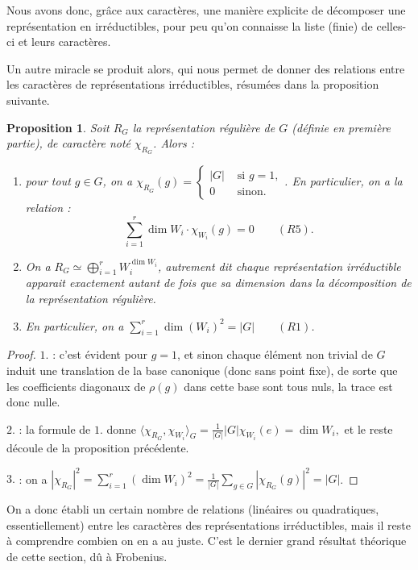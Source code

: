 \documentclass[a4paper]{article}
\theoremstyle{definition} %
\theoremstyle{plain} %
\newtheorem{Prop}[Def]{Proposition} %
\theoremstyle{remark} %
\begin{document}
Nous avons donc, grâce aux caractères, une manière explicite de décomposer une représentation en irréductibles, pour peu qu'on connaisse la liste (finie) de celles-ci et leurs caractères. 

Un autre miracle se produit alors, qui nous permet de donner des relations entre les caractères de représentations irréductibles, résumées dans la proposition suivante.

\begin{Prop}
	Soit $R_G$ la représentation régulière de $G$ (définie en première partie), de caractère noté $\chi_{R_G}$. Alors : 
	\begin{enumerate}
	\item pour tout $g \in G$, on a
	$\displaystyle \chi_{R_G}(g) = \left\{ \begin{array}{cl} |G| & {\text{ si }} g=1, \\
	0 & {\text{ sinon. }} \end{array} \right.$. En particulier, on a la relation :  \[
\sum_{i=1}^r \dim W_i \cdot \chi_{W_i} (g) = 0  \qquad (R5).\]
	
	\item On a 
	$\displaystyle R_G \simeq \bigoplus_{i=1}^r W_i^{\dim W_i}$,
	autrement dit chaque représentation irréductible apparait exactement autant de fois que sa dimension dans la décomposition de la représentation régulière.
	
	\item En particulier, on a \qquad $\displaystyle \sum_{i=1}^r \dim(W_i)^2 = |G| \qquad (R1)$.
	
	
\end{enumerate}
\end{Prop}

\begin{proof}
	$1.$ : c'est évident pour $g=1$, et sinon chaque élément non trivial de $G$ induit une translation de la base canonique (donc sans point fixe), de sorte que les coefficients diagonaux de $\rho(g)$ dans cette base sont tous nuls, la trace est donc nulle.
	
	$2.$ : la formule de $1.$ donne
	$\displaystyle \langle \chi_{R_G}, \chi_{W_i} \rangle_G = \frac{1}{|G|} |G| \chi_{W_i} (e) = \dim W_i,$
	et le reste découle de la proposition précédente. 
	
	$3.$ : on a $|\chi_{R_G}|^2=\sum_{i=1}^r (\dim W_i)^2=\frac{1}{|G|}\sum_{g\in G} |\chi_{R_G}(g)|^2=|G|$.
\end{proof}

On a donc établi un certain nombre de relations (linéaires ou quadratiques, essentiellement) entre les caractères des représentations irréductibles, mais il reste à comprendre combien on en a au juste. C'est le dernier grand résultat théorique de cette section, dû à Frobenius.
\end{document}
